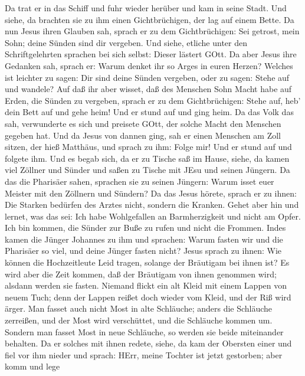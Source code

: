  Da trat er in das Schiff und fuhr wieder herüber und kam in
seine Stadt.  Und siehe, da brachten sie zu ihm einen
Gichtbrüchigen, der lag auf einem Bette. Da nun Jesus ihren Glauben sah,
sprach er zu dem Gichtbrüchigen: Sei getrost, mein Sohn; deine Sünden
sind dir vergeben.  Und siehe, etliche unter den
Schriftgelehrten sprachen bei sich selbst: Dieser lästert GOtt.
 Da aber Jesus ihre Gedanken sah, sprach er: Warum denket
ihr so Arges in euren Herzen?  Welches ist leichter zu
sagen: Dir sind deine Sünden vergeben, oder zu sagen: Stehe auf und
wandele?  Auf daß ihr aber wisset, daß des Menschen Sohn
Macht habe auf Erden, die Sünden zu vergeben, sprach er zu dem
Gichtbrüchigen: Stehe auf, heb' dein Bett auf und gehe heim!
 Und er stund auf und ging heim.  Da das Volk
das sah, verwunderte es sich und preisete GOtt, der solche Macht den
Menschen gegeben hat.  Und da Jesus von dannen ging, sah er
einen Menschen am Zoll sitzen, der hieß Matthäus, und sprach zu ihm:
Folge mir! Und er stund auf und folgete ihm.  Und es begab
sich, da er zu Tische saß im Hause, siehe, da kamen viel Zöllner und
Sünder und saßen zu Tische mit JEsu und seinen Jüngern.  Da
das die Pharisäer sahen, sprachen sie zu seinen Jüngern: Warum isset
euer Meister mit den Zöllnern und Sündern?  Da das Jesus
hörete, sprach er zu ihnen: Die Starken bedürfen des Arztes nicht,
sondern die Kranken.  Gehet aber hin und lernet, was das
sei: Ich habe Wohlgefallen an Barmherzigkeit und nicht am Opfer. Ich bin
kommen, die Sünder zur Buße zu rufen und nicht die Frommen.
 Indes kamen die Jünger Johannes zu ihm und sprachen: Warum
fasten wir und die Pharisäer so viel, und deine Jünger fasten nicht?
 Jesus sprach zu ihnen: Wie können die Hochzeitleute Leid
tragen, solange der Bräutigam bei ihnen ist? Es wird aber die Zeit
kommen, daß der Bräutigam von ihnen genommen wird; alsdann werden sie
fasten.  Niemand flickt ein alt Kleid mit einem Lappen von
neuem Tuch; denn der Lappen reißet doch wieder vom Kleid, und der Riß
wird ärger.  Man fasset auch nicht Most in alte Schläuche;
anders die Schläuche zerreißen, und der Most wird verschüttet, und die
Schläuche kommen um. Sondern man fasset Most in neue Schläuche, so
werden sie beide miteinander behalten.  Da er solches mit
ihnen redete, siehe, da kam der Obersten einer und fiel vor ihm nieder
und sprach: HErr, meine Tochter ist jetzt gestorben; aber komm und lege
